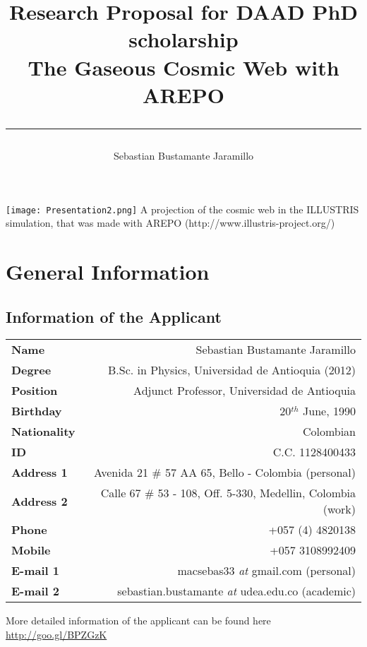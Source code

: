 \documentclass[a4,useAMS,usenatbib,usegraphicx,12pt]{article}
\title{{\textbf{Research Proposal for DAAD PhD scholarship}}\\ The Gaseous Cosmic Web with AREPO\\ \color{black}\rule{15cm}{0.5mm}}
\author{Sebastian Bustamante Jaramillo}
\date{}
\begin{document}
\maketitle
\begin{center}
\texttt{[image: Presentation2.png]}
\tiny{A projection of the cosmic web in the ILLUSTRIS simulation, that was made 
with AREPO (http://www.illustris-project.org/)}
\end{center}
\tableofcontents
 
\newpage 

\section{General Information}
\small
\subsection*{Information of the Applicant}
\begin{tabular}{L!{\VRule}R}
\bf Name		& Sebastian Bustamante Jaramillo\\
\bf Degree		& B.Sc. in Physics, Universidad de Antioquia (2012)\\
\bf Position	& Adjunct Professor, Universidad de Antioquia\\
\bf Birthday	& { 20$^{th}$ June, 1990}\\
\bf Nationality & Colombian\\
\bf ID			& C.C. 1128400433\\
\bf Address 1	& Avenida 21 \# 57 AA 65, Bello - Colombia (personal)\\
\bf Address 2	& Calle 67 \# 53 - 108, Off. 5-330, Medellin, Colombia (work)\\
\bf Phone		& +057 (4) 4820138\\
\bf Mobile		& +057 3108992409\\
\bf E-mail 1	& macsebas33 \textit{at} gmail.com (personal)\\
\bf E-mail 2	& sebastian.bustamante \textit{at} udea.edu.co (academic)\\
\end{tabular}

\vspace{10pt}

More detailed information of the applicant can be found here \url{http://goo.gl/BPZGzK}

\vspace{15pt}  
\end{document}
